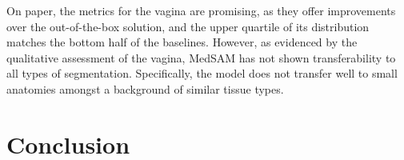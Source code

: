 \documentclass[11pt,twoside]{report}
\begin{document}
On paper, the metrics for the vagina are promising, as they offer improvements over the out-of-the-box solution, and the upper quartile of its distribution matches the bottom half of the baselines. However, as evidenced by the qualitative assessment of the vagina, MedSAM has not shown transferability to all types of segmentation. Specifically, the model does not transfer well to small anatomies amongst a background of similar tissue types. %

\chapter{Conclusion}\label{sect:conclusion}

\end{document}
